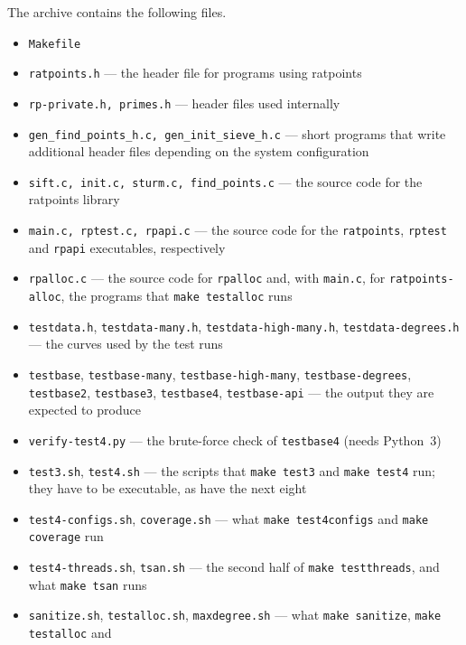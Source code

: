 \documentclass[12pt,a4paper,oneside]{amsart}
\begin{document}
{\sloppy%
The archive contains the following files.
\begin{itemize}
  \item \texttt{Makefile}
  \item \texttt{ratpoints.h} --- the header file for programs using ratpoints
  \item \texttt{rp-private.h, primes.h} --- header files used internally
  \item \texttt{gen\_find\_points\_h.c, gen\_init\_sieve\_h.c} ---
        short programs that write additional header files depending
        on the system configuration
  \item \texttt{sift.c, init.c, sturm.c, find\_points.c} ---
        the source code for the ratpoints library
  \item \texttt{main.c, rptest.c, rpapi.c} --- the source code for the
        \texttt{ratpoints}, \texttt{rptest} and \texttt{rpapi} executables,
        respectively
  \item \texttt{rpalloc.c} --- the source code for \texttt{rpalloc} and,
        with \texttt{main.c}, for \texttt{ratpoints-alloc}, the programs
        that \texttt{make testalloc} runs
  \item \texttt{testdata.h}, \texttt{testdata-many.h},
        \texttt{testdata-high-many.h}, \texttt{testdata-degrees.h} ---
        the curves used by the test runs
  \item \texttt{testbase}, \texttt{testbase-many},
        \texttt{testbase-high-many}, \texttt{testbase-degrees},
        \texttt{testbase2}, \texttt{testbase3}, \texttt{testbase4},
        \texttt{testbase-api} --- the output they are expected to produce
  \item \texttt{verify-test4.py} --- the brute-force check of
        \texttt{testbase4} (needs Python~3)
  \item \texttt{test3.sh}, \texttt{test4.sh} --- the scripts that
        \texttt{make test3} and \texttt{make test4} run; they have to be
        executable, as have the next eight
  \item \texttt{test4-configs.sh}, \texttt{coverage.sh} --- what
        \texttt{make test4configs} and \texttt{make coverage} run
  \item \texttt{test4-threads.sh}, \texttt{tsan.sh} --- the second half of
        \texttt{make testthreads}, and what \texttt{make tsan} runs
  \item \texttt{sanitize.sh}, \texttt{testalloc.sh}, \texttt{maxdegree.sh} ---
        what \texttt{make sanitize}, \texttt{make testalloc} and

\end{itemize}}
\end{document}
